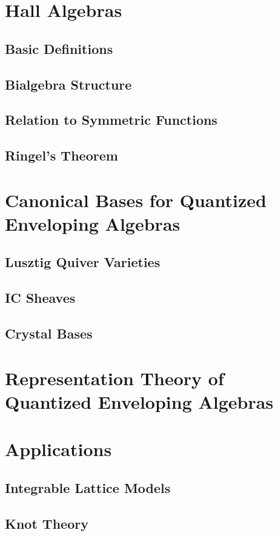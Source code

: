 \documentclass{book}
\begin{document}
\chapter{Hall Algebras}

  \section{Basic Definitions}

  \section{Bialgebra Structure}

  \section{Relation to Symmetric Functions}

  \section{Ringel's Theorem}


\chapter{Canonical Bases for Quantized Enveloping Algebras}

  \section{Lusztig Quiver Varieties}

  \section{IC Sheaves}

  \section{Crystal Bases}


\chapter{Representation Theory of Quantized Enveloping Algebras}


\chapter{Applications}

  \section{Integrable Lattice Models}

  \section{Knot Theory}
\end{document}
